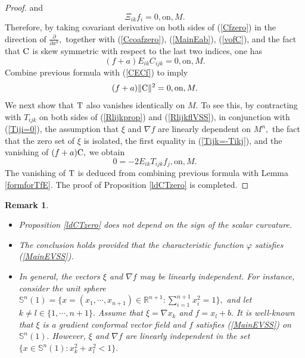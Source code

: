 \documentclass[10pt,leqno,oneside]{amsart}
\newtheorem{Rmk}{Remark}
\begin{document}
{\begin{proof}
       and
       \begin{equation}\label{Ccoafzero}\Xi_{ik}f_i=0, \text{on}, M.\end{equation}
       Therefore, by taking covariant derivative on both sides of (\ref{Cfzero}) in the direction of $\frac{\partial}{\partial x^k},$ together with (\ref{Ccoafzero}), (\ref{MainEab}), (\ref{vofC}), and the fact that ${\rm C}$ is skew symmetric with respect to the last two indices, one has
       \begin{equation*}
         (f+a)E_{ik}C_{ijk}=0, \text{on}, M.
       \end{equation*}
       Combine previous formula  with (\ref{CECf}) to imply
       \begin{equation*}
         (f+a)\|{\rm C}\|^2=0, \text{on}, M.
       \end{equation*}
       We next show that ${\rm T}$ also vanishes identically on $M.$ To see this, by contracting with $T_{ijk}$ on both sides of (\ref{Rlijkprop}) and (\ref{RlijkflVSS}), in conjunction with (\ref{Tiji=0}), the assumption that $\xi$ and $\nabla f$ are linearly dependent on $M^n,$ the fact that the zero set of $\xi$ is isolated, the first equality in (\ref{Tijk=-Tikj}), and the vanishing of $(f+a){\rm C},$ we obtain
       \[0=-2E_{ik}T_{ijk}f_{j}, \text{on}, M.\]
       The vanishing of ${\rm T}$ is deduced from combining previous formula with Lemma \ref{formforTfE}. The proof of Proposition \ref{ldCTzero} is completed.
    \end{proof}
    \begin{Rmk}\label{nlin}
       \begin{itemize}[leftmargin=0.5cm, itemindent=0.4cm]
         \item[{\rm(1)}.] Proposition {\rm\ref{ldCTzero}} does not depend on the sign of the scalar curvature.
         \item[{\rm(2)}.] The conclusion holds provided that the characteristic function $\varphi$ satisfies {\rm(\ref{MainEVSS})}.
         \item[{\rm(3)}.] In general, the vectors $\xi$ and $\nabla f$ may be linearly independent. For instance, consider the unit sphere $\mathbb{S}^n(1)=\{x=(x_1,\cdots,x_{n+1})\in\mathbb{R}^{n+1}:\sum_{i=1}^{n+1}x_i^2=1\},$ and let $k\neq l\in\{1,\cdots,n+1\}.$ Assume that $\xi=\nabla x_k$ and $f=x_l+b.$ It is well-known that $\xi$ is a gradient conformal vector field and $f$ satisfies {\rm(\ref{MainEVSS})} on $\mathbb{S}^n(1).$ However, $\xi$ and $\nabla f$ are linearly independent in the set $\{x\in\mathbb{S}^n(1):x_k^2+x_l^2<1\}.$
       \end{itemize}
    \end{Rmk}
}
\end{document}
